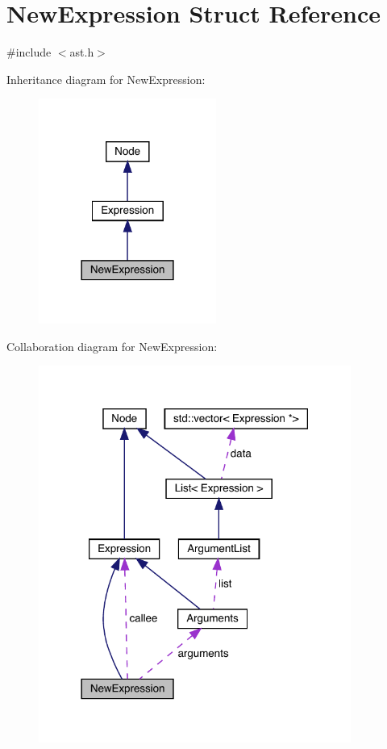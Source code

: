 \hypertarget{struct_new_expression}{}\section{New\+Expression Struct Reference}
\label{struct_new_expression}


{\ttfamily \#include $<$ast.\+h$>$}



Inheritance diagram for New\+Expression\+:\nopagebreak
\begin{figure}[H]
\begin{center}
\leavevmode
\includegraphics[width=165pt]{struct_new_expression__inherit__graph}
\end{center}
\end{figure}


Collaboration diagram for New\+Expression\+:\nopagebreak
\begin{figure}[H]
\begin{center}
\leavevmode
\includegraphics[width=290pt]{struct_new_expression__coll__graph}
\end{center}
\end{figure}
